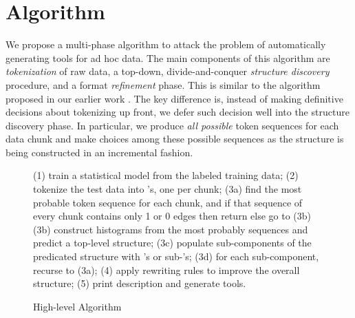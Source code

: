 
\section{Algorithm}\label{sec:algo}

We propose a multi-phase algorithm to attack the problem of
automatically generating tools for ad hoc data. 
The main components of
this algorithm are {\em tokenization} of raw data, 
a top-down, divide-and-conquer {\em structure discovery} procedure,
and a format {\em refinement} phase. This is similar to 
the algorithm proposed in our earlier work \cite{fisher+:dirttoshovels}. 
The key difference is, instead of making definitive decisions about 
tokenizing up front, we defer such decision well into the structure
discovery phase. In particular, we produce {\em all possible} token 
sequences for each data chunk and make choices among these possible 
sequences as the structure is being constructed in an incremental fashion.

\begin{figure}[t]
\begin{centercode}
(1) train a statistical model from the labeled training data;
(2) tokenize the test data into \seqset's, one \seqset{} per chunk;
(3a) find the most probable token sequence for each chunk, and 
     if that sequence of every chunk contains only 1 or 0 edges 
     then return else go to (3b)
(3b) construct histograms from the most probably sequences and 
     predict a top-level structure;
(3c) populate sub-components of the predicated structure with \seqset's
     or sub-\seqset's;
(3d) for each sub-component, recurse to (3a);
(4) apply rewriting rules to improve the overall structure;
(5) print description and generate tools.
\end{centercode}
\caption{High-level Algorithm}\label{fig:algo}
\end{figure}

